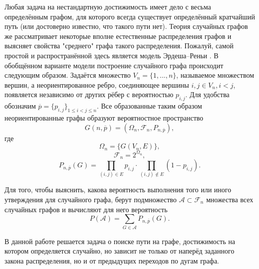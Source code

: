 Любая задача на нестандартную достижимость имеет дело с весьма определённым графом, для которого всегда существует определённый кратчайший путь (или достоверно известно, что такого пути нет). Теория случайных графов же рассматривает некоторые вполне естественные распределения графов и выясняет свойства "среднего" графа такого распределения. Пожалуй, самой простой и распространённой здесь является модель Эрдеша–Реньи \cite{erdyosh}. В обобщённом варианте модели построение случайного графа происходит следующим образом. Задаётся множество $V_n = \{1, ..., n\}$, называемое множеством вершин, а неориентированное ребро, соединяющее вершины $i, j \in V_n, i < j$, появляется независимо от других рёбер с вероятностью $p_{i,j}$. Для удобства обозначим $\overline{p} = \{p_{i,j}\}_{1 \le i < j \le n}$. Все образованные таким образом неориентированные графы образуют вероятностное пространство
$$	G(n, \overline{p}) = (\Omega_n, \mathcal{F}_n, P_{n, \overline{p}}), $$где
$$\Omega_n = \{G(V_n, E)\},$$ 
$$\mathcal{F}_n = 2^{\Omega_n},$$ 
$$P_{n, \overline{p}}(G) = \prod\limits_{(i,j) \in E} p_{i, j} \cdot \prod\limits_{(i,j) \notin E} (1 - p_{i, j}).$$

Для того, чтобы выяснить, какова вероятность выполнения того или иного утверждения для случайного графа, берут подмножество $\mathcal{A} \subset \mathcal{F}_n$ множества всех случайных графов и вычисляют для него вероятность 
$$ P(\mathcal{A}) = \sum_{G \in \mathcal{A}} P_{n, \overline{p}}(G). $$

В данной работе решается задача о поиске пути на графе, достижимость на котором определяется случайно, но зависит не только от наперёд заданного закона распределения, но и от предыдущих переходов по дугам графа.